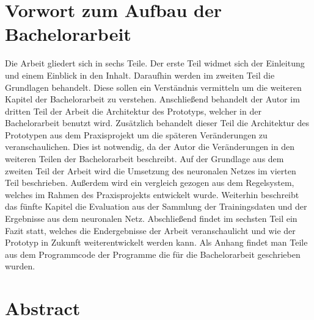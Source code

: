 \chapter*{Vorwort zum Aufbau der Bachelorarbeit}
Die Arbeit gliedert sich in sechs Teile. Der erste Teil widmet sich der Einleitung und einem Einblick in den Inhalt. Daraufhin werden im zweiten Teil die Grundlagen behandelt. Diese sollen ein Verständnis vermitteln um die weiteren Kapitel der Bachelorarbeit zu verstehen. 
\newline
\newline
Anschließend behandelt der Autor im dritten Teil der Arbeit die Architektur des Prototyps, welcher in der Bachelorarbeit benutzt wird. Zusätzlich behandelt dieser Teil die Architektur des Prototypen aus dem Praxisprojekt um die späteren Veränderungen zu veranschaulichen. Dies ist notwendig, da der Autor die Veränderungen in den weiteren Teilen der Bachelorarbeit beschreibt.
\newline
Auf der Grundlage aus dem zweiten Teil der Arbeit wird die Umsetzung des neuronalen Netzes im vierten Teil beschrieben. Außerdem wird ein vergleich gezogen aus dem Regelsystem, welches im Rahmen des Praxisprojekts entwickelt wurde.
\newline
Weiterhin beschreibt das fünfte Kapitel die Evaluation aus der Sammlung der Trainingsdaten und der Ergebnisse aus dem neuronalen Netz.
\newline
\newline
Abschließend findet im sechsten Teil ein Fazit statt, welches die Endergebnisse der Arbeit veranschaulicht und wie der Prototyp in Zukunft weiterentwickelt werden kann.
Als Anhang findet man Teile aus dem Programmcode der Programme die für die Bachelorarbeit geschrieben wurden.

\newpage
\chapter*{Abstract}


